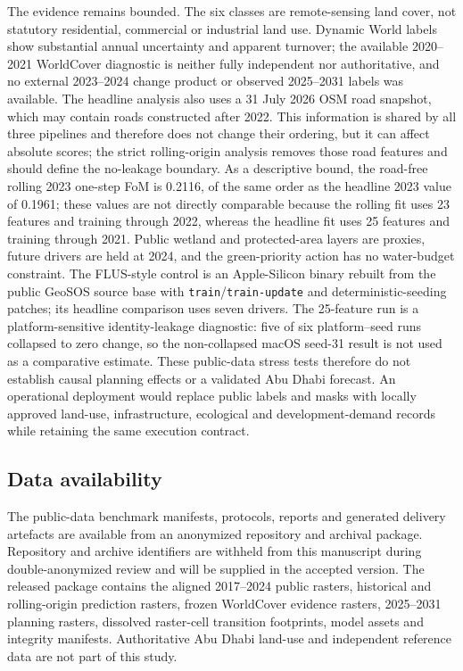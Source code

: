 \documentclass[
]{article}
\begin{document}
The evidence remains bounded. The six classes are remote-sensing land
cover, not statutory residential, commercial or industrial land use.
Dynamic World labels show substantial annual uncertainty and apparent
turnover; the available 2020--2021 WorldCover diagnostic is neither
fully independent nor authoritative, and no external 2023--2024 change
product or observed 2025--2031 labels was available. The headline
analysis also uses a 31 July 2026 OSM road snapshot, which may contain
roads constructed after 2022. This information is shared by all three
pipelines and therefore does not change their ordering, but it can
affect absolute scores; the strict rolling-origin analysis removes those
road features and should define the no-leakage boundary. As a
descriptive bound, the road-free rolling 2023 one-step FoM is 0.2116, of
the same order as the headline 2023 value of 0.1961; these values are
not directly comparable because the rolling fit uses 23 features and
training through 2022, whereas the headline fit uses 25 features and
training through 2021. Public wetland and protected-area layers are
proxies, future drivers are held at 2024, and the green-priority action
has no water-budget constraint. The FLUS-style control is an
Apple-Silicon binary rebuilt from the public GeoSOS source base with
\texttt{train}/\texttt{train-update} and deterministic-seeding patches;
its headline comparison uses seven drivers. The 25-feature run is a
platform-sensitive identity-leakage diagnostic: five of six
platform--seed runs collapsed to zero change, so the non-collapsed macOS
seed-31 result is not used as a comparative estimate. These public-data
stress tests therefore do not establish causal planning effects or a
validated Abu Dhabi forecast. An operational deployment would replace
public labels and masks with locally approved land-use, infrastructure,
ecological and development-demand records while retaining the same
execution contract.

\subsection{Data availability}\label{data-availability}

The public-data benchmark manifests, protocols, reports and generated
delivery artefacts are available from an anonymized repository and
archival package. Repository and archive identifiers are withheld from
this manuscript during double-anonymized review and will be supplied in
the accepted version. The released package contains the aligned
2017--2024 public rasters, historical and rolling-origin prediction
rasters, frozen WorldCover evidence rasters, 2025--2031 planning
rasters, dissolved raster-cell transition footprints, model assets and
integrity manifests. Authoritative Abu Dhabi land-use and independent
reference data are not part of this study.
\end{document}
